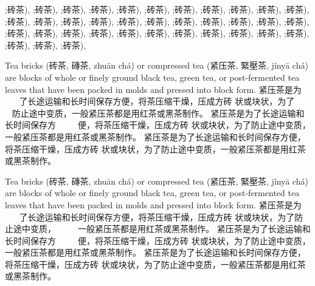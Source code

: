 \documentclass{article}
\newcommand{\cn}{\mktsFontfileSunexta\cjkgUseCjkGlue}
\newcommand{\cnxb}{%
  \cjkgGlue%
  \mktsFontfileSunextb%
  \aftergroup\cjkgGlue%
  }
\begin{document}
\mktsFontfileEBGaramondEightRegular

\begin{multicols}{3}%
;{\cn{}砖茶}), ;{\cn{}砖茶}), ;{\cn{}砖茶}), ;{\cn{}砖茶}), ;{\cn{}砖茶}), ;{\cn{}砖茶}),
;{\cn{}砖茶}), ;{\cn{}砖茶}), ;{\cn{}砖茶}), ;{\cn{}砖茶}), ;{\cn{}砖茶}), ;{\cn{}砖茶}),
;{\cn{}砖茶}), ;{\cn{}砖茶}), ;{\cn{}砖茶}), ;{\cn{}砖茶}), ;{\cn{}砖茶}), ;{\cn{}砖茶}),
;{\cn{}砖茶}), ;{\cn{}砖茶}), ;{\cn{}砖茶}), ;{\cn{}砖茶}), ;{\cn{}砖茶}), ;{\cn{}砖茶}),
;{\cn{}砖茶}), ;{\cn{}砖茶}), ;{\cn{}砖茶}), ;{\cn{}砖茶}), ;{\cn{}砖茶}), ;{\cn{}砖茶}),
;{\cn{}砖茶}), ;{\cn{}砖茶}), ;{\cn{}砖茶}), ;{\cn{}砖茶}), ;{\cn{}砖茶}), ;{\cn{}砖茶}),
\end{multicols}

\begin{multicols}{3}%
Tea bricks ({\cn{}砖茶}, {\cn{}磚茶}, zhuān chá) or compressed tea
({\cn{}紧压茶}, {\cn{}緊壓茶}, jǐnyā chá) are blocks of whole or finely ground black tea,
green tea, or post-fermented tea leaves that have been packed in molds and
pressed into block form. {\cn{}紧压茶是为{\cnxb{}𠁳𠁳𠁳𠁳𠁳𠁳𠁳𠁳}了长途运输和长时间保存方便，将茶压缩干燥，压成方砖
状或块状，为了{\cnxb{}𠁳𠁳𠁳𠁳𠁳𠁳𠁳𠁳}防止途中变质，一般紧压茶都是用红茶或黑茶制作。
紧压茶是为了长途运输和长时间保存方{\cnxb{}𠁳𠁳𠁳𠁳𠁳𠁳𠁳𠁳}便，将茶压缩干燥，压成方砖
状或块状，为了防止途中变质，一般紧压茶都是用红茶或黑茶制作。
紧压茶是为了长途运输和长时间保存方便，将茶压缩干燥，压成方砖
状或块状，为了防止途中变质，一般紧压茶都是用红茶或黑茶制作。}
\end{multicols}

\begin{multicols}{5}%
Tea bricks ({\cn{}砖茶}, {\cn{}磚茶}, zhuān chá) or compressed tea
({\cn{}紧压茶}, {\cn{}緊壓茶}, jǐnyā chá) are blocks of whole or finely ground black tea,
green tea, or post-fermented tea leaves that have been packed in molds and
pressed into block form. {\cn{}紧压茶是为{\cnxb{}𠁳𠁳𠁳𠁳𠁳𠁳𠁳𠁳}了长途运输和长时间保存方便，将茶压缩干燥，压成方砖
状或块状，为了防止途中变质，{\cnxb{}𠁳𠁳𠁳𠁳𠁳𠁳𠁳𠁳}一般紧压茶都是用红茶或黑茶制作。
紧压茶是为了长途运输和长时间保存方{\cnxb{}𠁳𠁳𠁳𠁳𠁳𠁳𠁳𠁳}便，将茶压缩干燥，压成方砖
状或块状，为了防止途中变质，一般紧压茶都是用红茶或黑茶制作。
紧压茶是为了长途运输和长时间保存方便，将茶压缩干燥，压成方砖
状或块状，为了防止途中变质，一般紧压茶都是用红茶或黑茶制作。}
\end{multicols}

\end{document}
